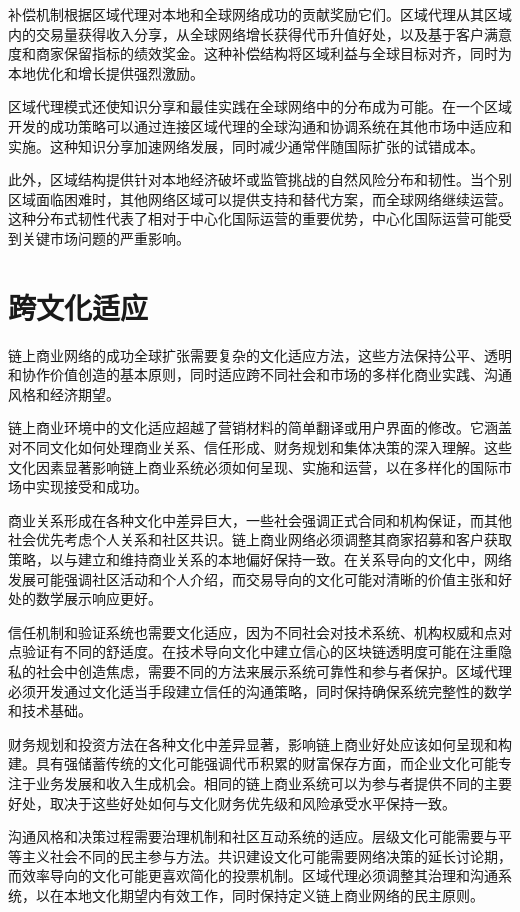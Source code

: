\documentclass[
  Letterpaper,
]{scrbook}
\begin{document}
补偿机制根据区域代理对本地和全球网络成功的贡献奖励它们。区域代理从其区域内的交易量获得收入分享，从全球网络增长获得代币升值好处，以及基于客户满意度和商家保留指标的绩效奖金。这种补偿结构将区域利益与全球目标对齐，同时为本地优化和增长提供强烈激励。

区域代理模式还使知识分享和最佳实践在全球网络中的分布成为可能。在一个区域开发的成功策略可以通过连接区域代理的全球沟通和协调系统在其他市场中适应和实施。这种知识分享加速网络发展，同时减少通常伴随国际扩张的试错成本。

此外，区域结构提供针对本地经济破坏或监管挑战的自然风险分布和韧性。当个别区域面临困难时，其他网络区域可以提供支持和替代方案，而全球网络继续运营。这种分布式韧性代表了相对于中心化国际运营的重要优势，中心化国际运营可能受到关键市场问题的严重影响。

\section{跨文化适应}\label{ux8de8ux6587ux5316ux9002ux5e94}

链上商业网络的成功全球扩张需要复杂的文化适应方法，这些方法保持公平、透明和协作价值创造的基本原则，同时适应跨不同社会和市场的多样化商业实践、沟通风格和经济期望。

链上商业环境中的文化适应超越了营销材料的简单翻译或用户界面的修改。它涵盖对不同文化如何处理商业关系、信任形成、财务规划和集体决策的深入理解。这些文化因素显著影响链上商业系统必须如何呈现、实施和运营，以在多样化的国际市场中实现接受和成功。

商业关系形成在各种文化中差异巨大，一些社会强调正式合同和机构保证，而其他社会优先考虑个人关系和社区共识。链上商业网络必须调整其商家招募和客户获取策略，以与建立和维持商业关系的本地偏好保持一致。在关系导向的文化中，网络发展可能强调社区活动和个人介绍，而交易导向的文化可能对清晰的价值主张和好处的数学展示响应更好。

信任机制和验证系统也需要文化适应，因为不同社会对技术系统、机构权威和点对点验证有不同的舒适度。在技术导向文化中建立信心的区块链透明度可能在注重隐私的社会中创造焦虑，需要不同的方法来展示系统可靠性和参与者保护。区域代理必须开发通过文化适当手段建立信任的沟通策略，同时保持确保系统完整性的数学和技术基础。

财务规划和投资方法在各种文化中差异显著，影响链上商业好处应该如何呈现和构建。具有强储蓄传统的文化可能强调代币积累的财富保存方面，而企业文化可能专注于业务发展和收入生成机会。相同的链上商业系统可以为参与者提供不同的主要好处，取决于这些好处如何与文化财务优先级和风险承受水平保持一致。

沟通风格和决策过程需要治理机制和社区互动系统的适应。层级文化可能需要与平等主义社会不同的民主参与方法。共识建设文化可能需要网络决策的延长讨论期，而效率导向的文化可能更喜欢简化的投票机制。区域代理必须调整其治理和沟通系统，以在本地文化期望内有效工作，同时保持定义链上商业网络的民主原则。
\end{document}
